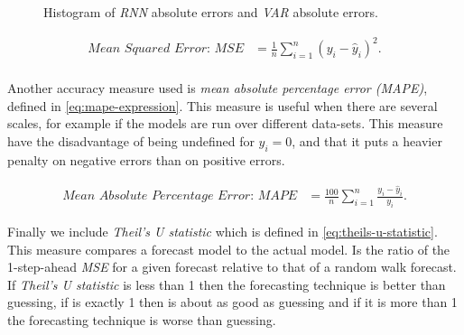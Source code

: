 \begin{figure}[bth]
  \caption{Histogram of \textit{RNN} absolute errors and \textit{VAR}
    absolute errors.}
  \label{fig:comparison-histogram-prediction-errors}
\end{figure}

\begin{equation}
  \begin{aligned}
    \label{eq:mse-expression}
    \textit{Mean Squared Error: MSE} & = \frac{1}{n} \sum_{i=1}^{n}
    (y_i - \hat{y}_i)^2.\\
  \end{aligned}
\end{equation}

Another accuracy measure used is \textit{mean absolute percentage
error (MAPE)}, defined in \autoref{eq:mape-expression}. This measure
is useful when there are several scales, for example if the models are
run over different data-sets. This measure have the disadvantage of
being undefined for $y_i = 0$, and that it puts a heavier penalty on
negative errors than on positive errors.

\begin{equation}
  \begin{aligned}
    \label{eq:mape-expression}
    \textit{Mean Absolute Percentage Error: MAPE} & = \frac{100}{n}
    \sum_{i=1}^{n} \frac{y_i - \hat{y}_i}{y_i}.
  \end{aligned}
\end{equation}

Finally we include \textit{Theil's U statistic} which is defined in
\autoref{eq:theils-u-statistic}. This measure compares a forecast
model to the actual model. Is the ratio of the 1-step-ahead
\textit{MSE} for a given forecast relative to that of a random walk
forecast. If \textit{Theil's U statistic} is less than 1 then the
forecasting technique is better than guessing, if is exactly 1 then is
about as good as guessing and if it is more than 1 the forecasting
technique is worse than guessing.

